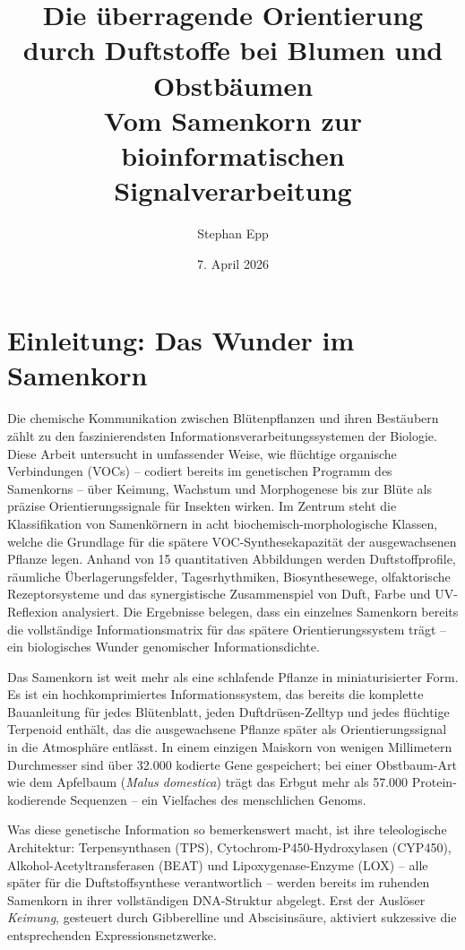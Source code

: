 ﻿\documentclass[12pt,a4paper]{article}
\title{{\bfseries Die \"uberragende Orientierung durch Duftstoffe
		bei Blumen und Obstb\"aumen\\[-0.1em]}
	{\Large	Vom Samenkorn zur bioinformatischen Signalverarbeitung}
}
\author{Stephan Epp}
\date{7. April 2026}
\begin{document}
\maketitle
\tableofcontents
\clearpage

\section{Einleitung: Das Wunder im Samenkorn}
Die chemische Kommunikation zwischen Bl\"utenpflanzen und ihren Best\"aubern z\"ahlt zu den faszinierendsten Informationsverarbeitungssystemen der Biologie. Diese Arbeit untersucht in umfassender Weise, wie fl\"uchtige organische Verbindungen (VOCs) -- codiert bereits im genetischen Programm des Samenkorns -- \"uber Keimung, Wachstum und Morphogenese bis zur Bl\"ute als pr\"azise Orientierungssignale f\"ur Insekten wirken. Im Zentrum steht die Klassifikation von Samenk\"ornern in acht biochemisch-morphologische Klassen, welche die Grundlage f\"ur die sp\"atere VOC-Synthesekapazit\"at der ausgewachsenen Pflanze legen. Anhand von 15 quantitativen Abbildungen werden Duftstoffprofile, r\"aumliche \"Uberlagerungsfelder, Tagesrhythmiken, Biosynthesewege, olfaktorische Rezeptorsysteme und das synergistische Zusammenspiel von Duft, Farbe und UV-Reflexion analysiert. Die Ergebnisse belegen, dass ein einzelnes Samenkorn bereits die vollst\"andige Informationsmatrix f\"ur das sp\"atere Orientierungssystem tr\"agt -- ein biologisches Wunder genomischer Informationsdichte.

Das Samenkorn ist weit mehr als eine schlafende Pflanze in miniaturisierter Form. Es ist ein hochkomprimiertes Informationssystem, das bereits die komplette Bauanleitung f\"ur jedes Bl\"utenblatt, jeden Duftdr\"usen-Zelltyp und jedes fl\"uchtige Terpenoid enth\"alt, das die ausgewachsene Pflanze sp\"ater als Orientierungssignal in die Atmosph\"are entl\"asst. In einem einzigen Maiskorn von wenigen Millimetern Durchmesser sind \"uber 32.000 kodierte Gene gespeichert; bei einer Obstbaum-Art wie dem Apfelbaum (\textit{Malus domestica}) tr\"agt das Erbgut mehr als 57.000 Protein-kodierende Sequenzen -- ein Vielfaches des menschlichen Genoms.

Was diese genetische Information so bemerkenswert macht, ist ihre teleologische Architektur: Terpensynthasen (TPS), Cytochrom-P450-Hydroxylasen (CYP450), Alkohol-Acetyltransferasen (BEAT) und Lipoxygenase-Enzyme (LOX) -- alle sp\"ater f\"ur die Duftstoffsynthese verantwortlich -- werden bereits im ruhenden Samenkorn in ihrer vollst\"andigen DNA-Struktur abgelegt. Erst der Ausl\"oser \emph{Keimung}, gesteuert durch Gibberelline und Abscisins\"aure, aktiviert sukzessive die entsprechenden Expressionsnetzwerke.
\end{document}
